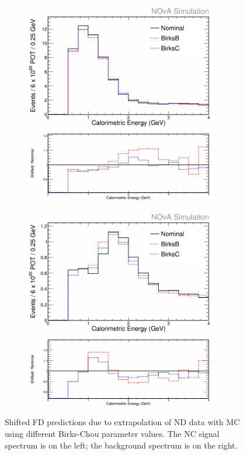 \begin{figure}[h]
  \centering
  \begin{subfigure}{.48\textwidth}
    \centering
    \includegraphics[width=1\linewidth]{figures/cNCEXBirksSysts.png}
  \end{subfigure}
  \begin{subfigure}{.48\textwidth}
    \centering
    \includegraphics[width=1\linewidth]{figures/cBGEXBirksSysts.png}
  \end{subfigure}
  \caption[Birks-Chou Shifted FD Predictions]{Shifted FD predictions due to extrapolation of ND data with MC using different Birks-Chou parameter values. The NC signal spectrum is on the left; the background spectrum is on the right.}
  \label{fig:SystBirks}
\end{figure}

